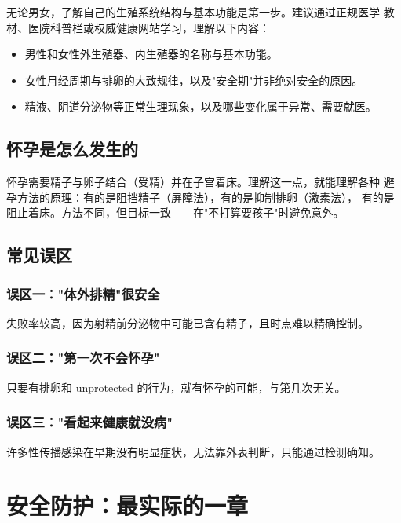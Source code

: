 无论男女，了解自己的生殖系统结构与基本功能是第一步。建议通过正规医学
教材、医院科普栏或权威健康网站学习，理解以下内容：

\begin{itemize}
  \item 男性和女性外生殖器、内生殖器的名称与基本功能。
  \item 女性月经周期与排卵的大致规律，以及"安全期"并非绝对安全的原因。
  \item 精液、阴道分泌物等正常生理现象，以及哪些变化属于异常、需要就医。
\end{itemize}

\section{怀孕是怎么发生的}

怀孕需要精子与卵子结合（受精）并在子宫着床。理解这一点，就能理解各种
避孕方法的原理：有的是阻挡精子（屏障法），有的是抑制排卵（激素法），
有的是阻止着床。方法不同，但目标一致——在"不打算要孩子"时避免意外。

\section{常见误区}

\subsection*{误区一："体外排精"很安全}
失败率较高，因为射精前分泌物中可能已含有精子，且时点难以精确控制。

\subsection*{误区二："第一次不会怀孕"}
只要有排卵和 unprotected 的行为，就有怀孕的可能，与第几次无关。

\subsection*{误区三："看起来健康就没病"}
许多性传播感染在早期没有明显症状，无法靠外表判断，只能通过检测确知。

\chapter{安全防护：最实际的一章}

